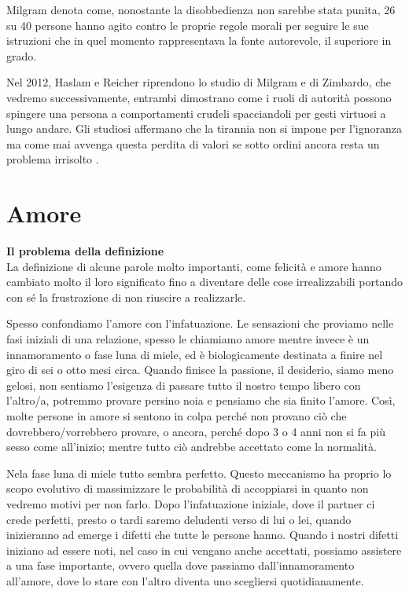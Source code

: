 \documentclass[12pt]{book} %
\begin{document}
\begin{mdframed}[linewidth=1pt]
Milgram denota come, nonostante la disobbedienza non sarebbe stata punita, 26 su 40 persone hanno agito contro le
proprie regole morali per seguire le sue istruzioni che in quel momento rappresentava la fonte autorevole, il superiore
in grado.


\bigskip

Nel 2012, Haslam e Reicher riprendono lo studio di Milgram e di Zimbardo, che vedremo successivamente, entrambi
dimostrano come i ruoli di autorità possono spingere una persona a comportamenti crudeli spacciandoli per gesti
virtuosi a lungo andare. Gli studiosi affermano che la tirannia non si impone per l'ignoranza ma
come mai avvenga questa perdita di valori se sotto ordini ancora resta un problema
irrisolto
. 
\end{mdframed}

\clearpage\section{Amore}
\noindent \textbf{\large Il problema della definizione} \\
La definizione di alcune parole molto importanti, come felicità e amore hanno cambiato molto il loro significato fino a diventare delle cose irrealizzabili portando con sé la frustrazione di non riuscire a realizzarle.

Spesso confondiamo l'amore con l'infatuazione. Le sensazioni che proviamo nelle fasi iniziali di una relazione, spesso le chiamiamo amore mentre invece è un innamoramento o fase luna di miele, ed è
biologicamente destinata a finire nel giro di sei o otto mesi circa. Quando finisce la passione, il desiderio, siamo meno gelosi, non sentiamo
l'esigenza di passare tutto il nostro tempo libero con l'altro/a, potremmo provare persino
noia e pensiamo che sia finito l'amore. Così, molte persone in amore si sentono
in colpa perché non provano ciò che dovrebbero/vorrebbero provare, o ancora, perché dopo 3 o 4 anni non si fa più sesso come all'inizio; mentre tutto ciò andrebbe accettato come la normalità.

Nela fase luna di miele tutto sembra perfetto. Questo meccanismo ha proprio lo scopo evolutivo di massimizzare le probabilità di accoppiarsi in quanto non vedremo motivi per non farlo. Dopo l'infatuazione iniziale, dove il partner ci crede perfetti, presto o tardi saremo
deludenti verso di lui o lei, quando inizieranno ad emerge i difetti che tutte le persone hanno. Quando
i nostri difetti iniziano ad essere noti, nel caso in cui vengano anche accettati, possiamo assistere a una fase
importante, ovvero quella dove passiamo dall'innamoramento all'amore, dove lo
stare con l'altro diventa uno scegliersi quotidianamente. 
\end{document}

